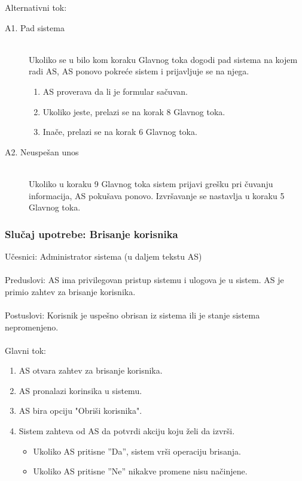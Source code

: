 \noindent Alternativni tok:
\begin{description}
	\item[A1. Pad sistema] ~\\
	Ukoliko se u bilo kom koraku Glavnog toka dogodi pad sistema na kojem radi AS, AS ponovo pokre\'ce sistem i prijavljuje se na njega.
	\begin{enumerate}
		\item AS proverava da li je formular sa\v cuvan.
		\item Ukoliko jeste, prelazi se na korak 8 Glavnog toka.
		\item Ina\v ce, prelazi se na korak 6 Glavnog toka.
	\end{enumerate}
	\item[A2. Neuspe\v san unos] ~\\
	Ukoliko u koraku 9 Glavnog toka sistem prijavi gre\v sku pri \v cuvanju informacija, AS poku\v sava ponovo. Izvr\v savanje se nastavlja u koraku 5 Glavnog toka.
\end{description}


\subsubsection{Slu\v caj upotrebe: Brisanje korisnika}

\label{su: brisanje korisnika}

\noindent U\v cesnici: Administrator sistema (u daljem tekstu AS)
\\
\\ Preduslovi: AS ima privilegovan pristup sistemu i ulogova je u sistem. AS je primio zahtev za brisanje korisnika.
\\
\\ Postuslovi: Korisnik je uspe\v sno obrisan iz sistema ili je stanje sistema nepromenjeno.
\\
\\ Glavni tok:
\begin{enumerate}
	\item AS otvara zahtev za brisanje korisnika.
	\item AS pronalazi korinsika u sistemu.
	\item AS bira opciju "Obri\v si korisnika".
	\item Sistem zahteva od AS da potvrdi akciju koju \v zeli da izvr\v si.
	\begin{itemize}
		\item Ukoliko AS pritisne ''Da'', sistem vr\v si operaciju brisanja.
		\item Ukoliko AS pritisne ''Ne'' nikakve promene nisu na\v cinjene.
	\end{itemize}
\end{enumerate}


